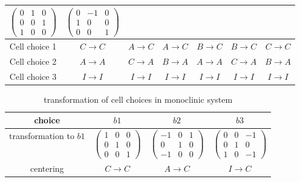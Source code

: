 \begin{table}[tb]
\begin{tabular}{c|cccccc}
      $\begin{pmatrix} 0&1&0 \\ 0&0&1 \\ 1&0&0 \end{pmatrix}$ &
      $\begin{pmatrix} 0&-1&0 \\ 1&0&0 \\ 0&0&1 \end{pmatrix}$ \\
    \hline
    Cell choice 1 & $C \to C$ & $A \to C$ & $A \to C$ & $B \to C$ & $B \to C$ & $C \to C$ \\
    Cell choice 2 & $A \to A$ & $C \to A$ & $B \to A$ & $A \to A$ & $C \to A$ & $B \to A$ \\
    Cell choice 3 & $I \to I$ & $I \to I$ & $I \to I$ & $I \to I$ & $I \to I$ & $I \to I$ \\
    \hline
  \end{tabular}
\end{table}

\begin{table}[tb]
  \centering
  \caption{transformation of cell choices in monoclinic system}
  \label{table-monoclinic-cellchoice}
  \begin{tabular}{c|ccc}
    \hline
    choice                 & $b1$                                                & $b2$                                                  & $b3$                                                  \\
    \hline
    transformation to $b1$ & $\begin{pmatrix} 1&0&0\\0&1&0\\0&0&1 \end{pmatrix}$ & $\begin{pmatrix} -1&0&1\\0&1&0\\-1&0&0 \end{pmatrix}$ & $\begin{pmatrix} 0&0&-1\\0&1&0\\1&0&-1 \end{pmatrix}$ \\
    \hline
    centering              & $C \to C$                                           & $A \to C$                                             & $I \to C$                                             \\
    \hline
  \end{tabular}
\end{table}

